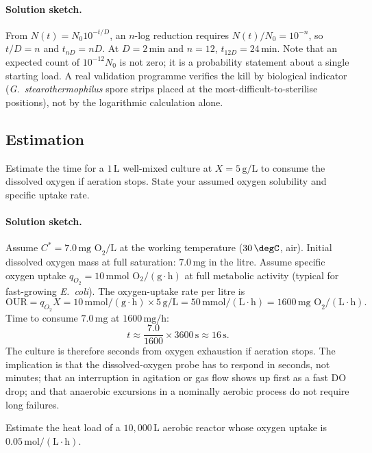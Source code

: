 \paragraph{Solution sketch.}
From $N(t) = N_0 10^{-t/D}$, an $n$-log reduction requires
$N(t)/N_0 = 10^{-n}$, so $t/D = n$ and $t_{nD} = n D$. At $D = 2\,\text{min}$
and $n = 12$, $t_{12D} = 24\,\text{min}$. Note that an
expected count of $10^{-12} N_0$ is not zero; it is a probability
statement about a single starting load. A real validation programme
verifies the kill by biological indicator (\emph{G.\ stearothermophilus}
spore strips placed at the most-difficult-to-sterilise positions),
not by the logarithmic calculation alone.

\subsection*{Estimation}

\begin{exercise}
Estimate the time for a $1\,\text{L}$ well-mixed culture at
$X=5\,\text{g}/\text{L}$ to consume the dissolved oxygen if aeration
stops. State your assumed oxygen solubility and specific uptake rate.
\end{exercise}

\paragraph{Solution sketch.}
Assume $C^\ast = 7.0\,\text{mg O}_2/\text{L}$ at the working
temperature ($30\,\degC$, air). Initial dissolved oxygen mass at full
saturation: $7.0\,\text{mg}$ in the litre. Assume specific oxygen
uptake $q_{O_2} = 10\,\text{mmol O}_2/(\text{g}\cdot\text{h})$ at full
metabolic activity (typical for fast-growing \emph{E.\ coli}). The
oxygen-uptake rate per litre is
\[
\text{OUR} = q_{O_2} X
= 10\,\text{mmol}/(\text{g}\cdot\text{h})\times 5\,\text{g/L}
= 50\,\text{mmol}/(\text{L}\cdot\text{h})
= 1600\,\text{mg O}_2/(\text{L}\cdot\text{h}).
\]
Time to consume $7.0\,\text{mg}$ at $1600\,\text{mg}/\text{h}$:
\[
t \approx \frac{7.0}{1600} \times 3600\,\text{s} \approx 16\,\text{s}.
\]
The culture is therefore seconds from oxygen exhaustion if aeration
stops. The implication is that the dissolved-oxygen probe has to
respond in seconds, not minutes; that an interruption in agitation or
gas flow shows up first as a fast DO drop; and that anaerobic excursions
in a nominally aerobic process do not require long failures.

\begin{exercise}
Estimate the heat load of a $10{,}000\,\text{L}$ aerobic reactor whose
oxygen uptake is $0.05\,\text{mol}/(\text{L}\cdot\text{h})$.
\end{exercise}

